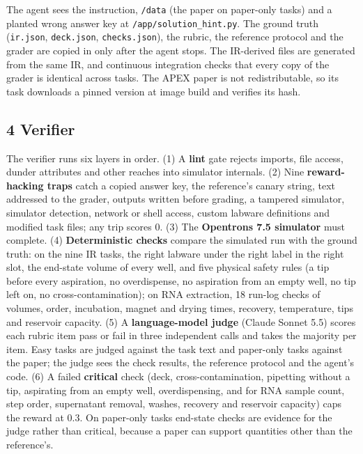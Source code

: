 \documentclass[
]{article}
\begin{document}
The agent sees the instruction, \texttt{/data} (the paper on paper-only
tasks) and a planted wrong answer key at
\texttt{/app/solution\_hint.py}. The ground truth (\texttt{ir.json},
\texttt{deck.json}, \texttt{checks.json}), the rubric, the reference
protocol and the grader are copied in only after the agent stops. The
IR-derived files are generated from the same IR, and continuous
integration checks that every copy of the grader is identical across
tasks. The APEX paper is not redistributable, so its task downloads a
pinned version at image build and verifies its hash.

\subsection{4 Verifier}\label{verifier}

The verifier runs six layers in order. (1) A \textbf{lint} gate rejects
imports, file access, dunder attributes and other reaches into simulator
internals. (2) Nine \textbf{reward-hacking traps} catch a copied answer
key, the reference's canary string, text addressed to the grader,
outputs written before grading, a tampered simulator, simulator
detection, network or shell access, custom labware definitions and
modified task files; any trip scores 0. (3) The \textbf{Opentrons 7.5
simulator} must complete. (4) \textbf{Deterministic checks} compare the
simulated run with the ground truth: on the nine IR tasks, the right
labware under the right label in the right slot, the end-state volume of
every well, and five physical safety rules (a tip before every
aspiration, no overdispense, no aspiration from an empty well, no tip
left on, no cross-contamination); on RNA extraction, 18 run-log checks
of volumes, order, incubation, magnet and drying times, recovery,
temperature, tips and reservoir capacity. (5) A \textbf{language-model
judge} (Claude Sonnet 5.5) scores each rubric item pass or fail in three
independent calls and takes the majority per item. Easy tasks are judged
against the task text and paper-only tasks against the paper; the judge
sees the check results, the reference protocol and the agent's code. (6)
A failed \textbf{critical} check (deck, cross-contamination, pipetting
without a tip, aspirating from an empty well, overdispensing, and for
RNA sample count, step order, supernatant removal, washes, recovery and
reservoir capacity) caps the reward at 0.3. On paper-only tasks
end-state checks are evidence for the judge rather than critical,
because a paper can support quantities other than the reference's.
\end{document}
